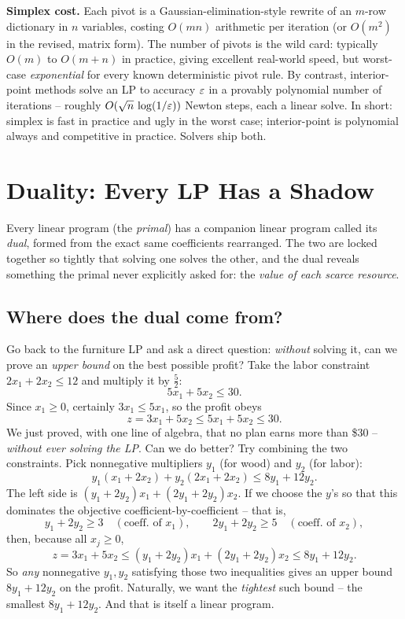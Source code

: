 \begin{complexitybox}
\textbf{Simplex cost.} Each pivot is a Gaussian-elimination-style rewrite of an
$m$-row dictionary in $n$ variables, costing $O(mn)$ arithmetic per iteration
(or $O(m^2)$ in the revised, matrix form). The number of pivots is the wild
card: typically $O(m)$ to $O(m+n)$ in practice, giving excellent real-world
speed, but worst-case \emph{exponential} for every known deterministic pivot
rule. By contrast, interior-point methods solve an LP to accuracy $\varepsilon$ in a
provably polynomial number of iterations -- roughly $O(\sqrt{n}\,\log(1/\varepsilon))$
Newton steps, each a linear solve. In short: simplex is fast in practice and
ugly in the worst case; interior-point is polynomial always and competitive in
practice. Solvers ship both.
\end{complexitybox}

\section{Duality: Every LP Has a Shadow}
\label{ch28:duality}

Every linear program (the \emph{primal}) has a companion linear program
called its \emph{dual}, formed from the exact same coefficients rearranged.
The two are locked together so tightly that solving one solves the other, and
the dual reveals something the primal never explicitly asked for: the
\emph{value of each scarce resource}.

\subsection{Where does the dual come from?}

Go back to the furniture LP and ask a direct question: \emph{without} solving
it, can we prove an \emph{upper bound} on the best possible profit?
Take the labor constraint $2x_1 + 2x_2 \le 12$ and multiply it by $\tfrac52$:
\[
5x_1 + 5x_2 \le 30 .
\]
Since $x_1 \ge 0$, certainly $3x_1 \le 5x_1$, so the profit obeys
\[
z = 3x_1 + 5x_2 \le 5x_1 + 5x_2 \le 30 .
\]
We just proved, with one line of algebra, that no plan earns more than \$30 --
\emph{without ever solving the LP}. Can we do better? Try combining the two
constraints. Pick nonnegative multipliers $y_1$ (for wood) and $y_2$ (for
labor):
\[
y_1(x_1 + 2x_2) + y_2(2x_1 + 2x_2) \le 8y_1 + 12y_2 .
\]
The left side is $(y_1 + 2y_2)x_1 + (2y_1 + 2y_2)x_2$. If we choose the $y$'s so
that this dominates the objective coefficient-by-coefficient -- that is,
\[
y_1 + 2y_2 \ge 3 \quad(\text{coeff. of }x_1),\qquad
2y_1 + 2y_2 \ge 5 \quad(\text{coeff. of }x_2),
\]
then, because all $x_j \ge 0$,
\[
z = 3x_1 + 5x_2 \le (y_1+2y_2)x_1 + (2y_1+2y_2)x_2 \le 8y_1 + 12y_2 .
\]
So \emph{any} nonnegative $y_1, y_2$ satisfying those two inequalities gives an
upper bound $8y_1 + 12y_2$ on the profit. Naturally, we want the
\emph{tightest} such bound -- the smallest $8y_1 + 12y_2$. And that is itself a
linear program.

